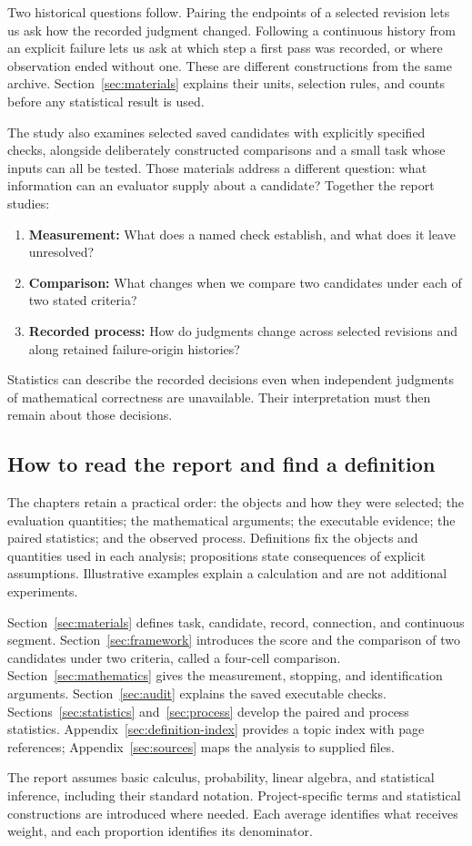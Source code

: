 Two historical questions follow. Pairing the endpoints of a selected revision lets us ask how the recorded judgment changed. Following a continuous history from an explicit failure lets us ask at which step a first pass was recorded, or where observation ended without one. These are different constructions from the same archive. Section~\ref{sec:materials} explains their units, selection rules, and counts before any statistical result is used.

The study also examines selected saved candidates with explicitly specified checks, alongside deliberately constructed comparisons and a small task whose inputs can all be tested. Those materials address a different question: what information can an evaluator supply about a candidate? Together the report studies:
\begin{enumerate}[leftmargin=*]
\item \textbf{Measurement:} What does a named check establish, and what does it leave unresolved?
\item \textbf{Comparison:} What changes when we compare two candidates under each of two stated criteria?
\item \textbf{Recorded process:} How do judgments change across selected revisions and along retained failure-origin histories?
\end{enumerate}
Statistics can describe the recorded decisions even when independent judgments of mathematical correctness are unavailable. Their interpretation must then remain about those decisions.

\subsection{How to read the report and find a definition}
The chapters retain a practical order: the objects and how they were selected; the evaluation quantities; the mathematical arguments; the executable evidence; the paired statistics; and the observed process. Definitions fix the objects and quantities used in each analysis; propositions state consequences of explicit assumptions. Illustrative examples explain a calculation and are not additional experiments.

Section~\ref{sec:materials} defines task, candidate, record, connection, and continuous segment. Section~\ref{sec:framework} introduces the score and the comparison of two candidates under two criteria, called a four-cell comparison. Section~\ref{sec:mathematics} gives the measurement, stopping, and identification arguments. Section~\ref{sec:audit} explains the saved executable checks. Sections~\ref{sec:statistics} and~\ref{sec:process} develop the paired and process statistics. Appendix~\ref{sec:definition-index} provides a topic index with page references; Appendix~\ref{sec:sources} maps the analysis to supplied files.

The report assumes basic calculus, probability, linear algebra, and statistical inference, including their standard notation. Project-specific terms and statistical constructions are introduced where needed. Each average identifies what receives weight, and each proportion identifies its denominator.
